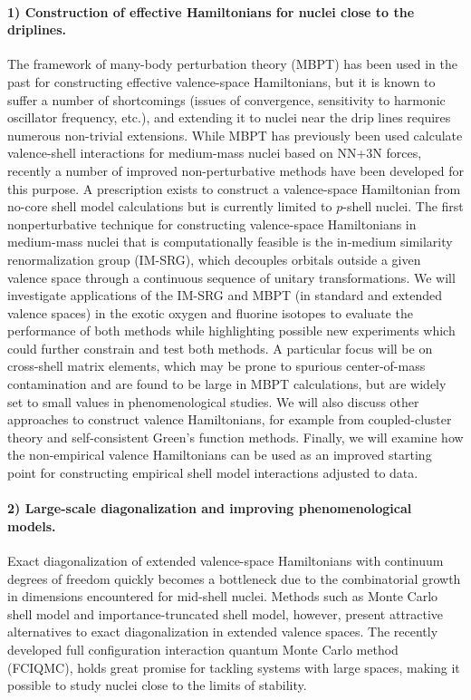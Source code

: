 \documentclass[%
twoside,                 %
final,                   %
10pt]{article}
\begin{document}
\paragraph{1) Construction of effective Hamiltonians for nuclei close to the driplines.}
The framework of many-body perturbation theory (MBPT) has been used in the past 
for constructing effective valence-space Hamiltonians, but it is known to suffer a number of shortcomings (issues of convergence, sensitivity to harmonic oscillator frequency, etc.), and extending it to nuclei near the drip lines requires numerous non-trivial extensions. While MBPT has previously been used calculate 
valence-shell interactions for medium-mass nuclei based on NN+3N forces, 
recently a number of improved non-perturbative methods have been developed for this purpose.  A prescription exists to construct a valence-space Hamiltonian from no-core shell model 
calculations but is currently limited to $p$-shell nuclei.  The first 
nonperturbative technique for constructing valence-space Hamiltonians in 
medium-mass nuclei that is computationally feasible is the in-medium similarity 
renormalization group (IM-SRG), which decouples orbitals outside a given 
valence space through a continuous sequence of unitary transformations.  
We will investigate applications of the IM-SRG and MBPT (in standard and extended valence 
spaces) in the exotic oxygen and fluorine isotopes to evaluate the performance of both methods while highlighting possible new experiments which could further constrain and test both methods.  A particular focus will be on cross-shell matrix elements, which may be prone to spurious center-of-mass contamination and are found to 
be large in MBPT calculations, but are widely set to small values in 
phenomenological studies.  We will also discuss other approaches to construct valence Hamiltonians, for example from 
coupled-cluster theory and self-consistent Green's function methods. Finally, we will examine how the non-empirical valence Hamiltonians can be used as an improved starting point for constructing empirical shell model interactions adjusted to data.




\paragraph{2) Large-scale diagonalization and improving phenomenological models.}
Exact diagonalization of extended valence-space Hamiltonians with continuum degrees of freedom quickly becomes a bottleneck due to the combinatorial growth in
dimensions encountered for mid-shell nuclei. Methods such as Monte Carlo shell model
and importance-truncated shell model, however, present attractive
alternatives to exact diagonalization in extended valence spaces.  The
recently developed full configuration interaction quantum Monte Carlo method (FCIQMC), holds great promise for tackling systems with large
spaces, making it possible to study nuclei close to the limits of
stability.
\end{document}
